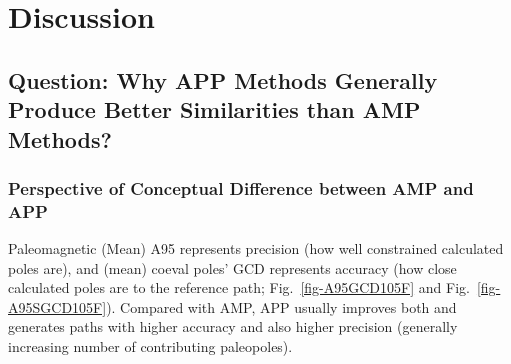 \begin{landscape}
\begin{table}[]
{\begin{tabular}{@{}clllllcccccccc@{}}
 &  &  &  &  &  &  &  &  &  &  &  &  &  \\ \bottomrule
\end{tabular}%
}
\end{table}
\end{landscape}

\section{Discussion}

\subsection{Question: Why APP Methods Generally Produce Better Similarities than
AMP Methods?}

\subsubsection{Perspective of Conceptual Difference between AMP and APP}

Paleomagnetic (Mean) A95 represents precision (how well constrained calculated
poles are), and (mean) coeval poles' GCD represents accuracy (how close
calculated poles are to the reference path; Fig.~\ref{fig-A95GCD105F} and
Fig.~\ref{fig-A95SGCD105F}). Compared with AMP, APP usually improves both and
generates paths with higher accuracy and also higher precision (generally
increasing number of contributing paleopoles).

